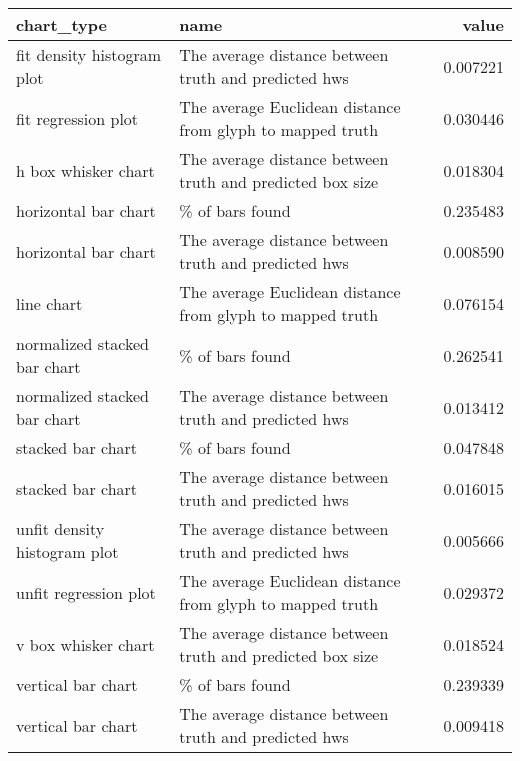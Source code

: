 \begin{tabular}{llr}
\toprule
                  chart\_type &                                                      name &    value \\
\midrule
  fit density histogram plot &      The average distance between truth and predicted hws & 0.007221 \\
         fit regression plot & The average Euclidean distance from glyph to mapped truth & 0.030446 \\
         h box whisker chart & The average distance between truth and predicted box size & 0.018304 \\
        horizontal bar chart &                                           \% of bars found & 0.235483 \\
        horizontal bar chart &      The average distance between truth and predicted hws & 0.008590 \\
                  line chart & The average Euclidean distance from glyph to mapped truth & 0.076154 \\
normalized stacked bar chart &                                           \% of bars found & 0.262541 \\
normalized stacked bar chart &      The average distance between truth and predicted hws & 0.013412 \\
           stacked bar chart &                                           \% of bars found & 0.047848 \\
           stacked bar chart &      The average distance between truth and predicted hws & 0.016015 \\
unfit density histogram plot &      The average distance between truth and predicted hws & 0.005666 \\
       unfit regression plot & The average Euclidean distance from glyph to mapped truth & 0.029372 \\
         v box whisker chart & The average distance between truth and predicted box size & 0.018524 \\
          vertical bar chart &                                           \% of bars found & 0.239339 \\
          vertical bar chart &      The average distance between truth and predicted hws & 0.009418 \\
\bottomrule
\end{tabular}
